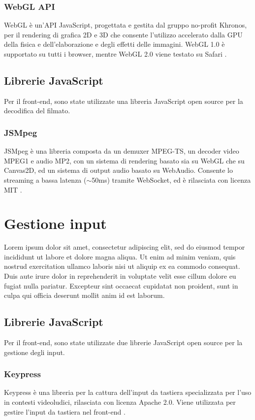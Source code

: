 \subsubsection{WebGL API}
WebGL è un'API JavaScript, progettata e gestita dal gruppo no-profit Khronos, per il rendering di grafica 2D e 3D che consente l'utilizzo accelerato dalla GPU della fisica e dell'elaborazione e degli effetti delle immagini. WebGL 1.0 è supportato su tutti i browser, mentre WebGL 2.0 viene testato su Safari \parencite{WebGL}.



\subsection{Librerie JavaScript}
Per il front-end, sono state utilizzate una libreria JavaScript open source per la decodifica del filmato.

\subsubsection{JSMpeg}
JSMpeg è una libreria composta da un demuxer MPEG-TS, un decoder video MPEG1 e audio MP2, con un sistema di rendering basato sia su WebGL che su Canvas2D, ed un sistema di output audio basato su WebAudio. Consente lo streaming a bassa latenza ($\sim$50ms) tramite WebSocket, ed è rilasciata con licenza MIT \parencite{JSMpeg}.




\section{Gestione input}
Lorem ipsum dolor sit amet, consectetur adipiscing elit, sed do eiusmod tempor incididunt ut labore et dolore magna aliqua. Ut enim ad minim veniam, quis nostrud exercitation ullamco laboris nisi ut aliquip ex ea commodo consequat. Duis aute irure dolor in reprehenderit in voluptate velit esse cillum dolore eu fugiat nulla pariatur. Excepteur sint occaecat cupidatat non proident, sunt in culpa qui officia deserunt mollit anim id est laborum.

\subsection{Librerie JavaScript}
Per il front-end, sono state utilizzate due librerie JavaScript open source per la gestione degli input.

\subsubsection{Keypress}
Keypress è una libreria per la cattura dell'input da tastiera specializzata per l'uso in contesti videoludici, rilasciata con licenza Apache 2.0. Viene utilizzata per gestire l'input da tastiera nel front-end \parencite{Keypress}.

